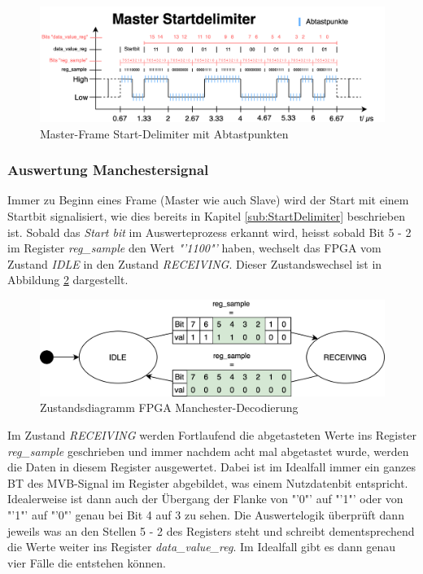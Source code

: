 \begin{figure}[H]
    \centering
    \includegraphics[width=1\linewidth]{Figures/Chap3/FPGA/Abtastpunkte_Master.png}
    \caption{Master-Frame Start-Delimiter mit Abtastpunkten}
    \label{fig:MasterframeAbtastung}
\end{figure}

\subsubsection{Auswertung Manchestersignal}
\label{Auswertung Manchestersignal}
Immer zu Beginn eines Frame (Master wie auch Slave) wird der Start mit einem Startbit signalisiert, wie dies bereits in Kapitel \ref{sub:StartDelimiter} beschrieben ist.
Sobald das \textit{Start bit} im Auswerteprozess erkannt wird, heisst sobald Bit 5 - 2 im Register \textit{reg\_sample} den Wert \textit{"'1100"'} haben, wechselt das FPGA vom Zustand \textit{IDLE} in den Zustand \textit{RECEIVING}. Dieser Zustandswechsel ist in Abbildung \ref{fig:FPGAIdleRec} dargestellt.

\begin{figure}[H]
    \centering
    \includegraphics[width=0.7\linewidth]{Figures//Chap3//FPGA/FPGA_idle_rec.png}
    \caption{Zustandsdiagramm FPGA Manchester-Decodierung}
    \label{fig:FPGAIdleRec}
\end{figure}

Im Zustand \textit{RECEIVING} werden Fortlaufend die abgetasteten Werte ins Register 
\textit{reg\_sample} geschrieben und immer nachdem acht mal abgetastet wurde, werden die Daten in diesem Register ausgewertet. Dabei ist im Idealfall immer ein ganzes BT des MVB-Signal im Register abgebildet, was einem Nutzdatenbit entspricht. Idealerweise ist dann auch der Übergang der Flanke von "'0"' auf "'1"' oder von "'1"' auf "'0"' genau bei Bit 4 auf 3 zu sehen. Die Auswertelogik überprüft dann jeweils was an den Stellen 5 - 2 des Registers steht und schreibt dementsprechend die Werte weiter ins Register \textit{data\_value\_reg}. Im Idealfall gibt es dann genau vier Fälle die entstehen können.


